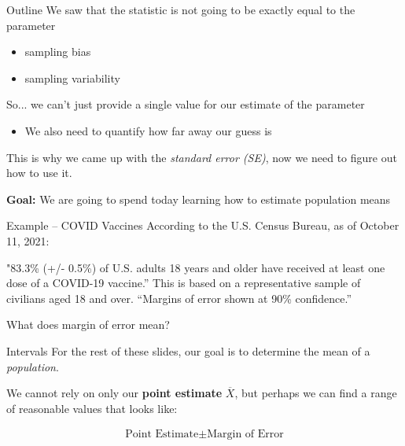 \documentclass{beamer}
\begin{document}
\begin{frame}{Outline}
We saw that the statistic is not going to be exactly equal to the parameter
\begin{itemize}
    \item sampling bias
    \item sampling variability
\end{itemize} \vspace{6mm}

So... we can't just provide a single value for our estimate of the parameter
\begin{itemize}
    \item We also need to quantify how far away our guess is
\end{itemize} \vspace{6mm}

This is why we came up with the \textit{standard error (SE)}, now we need to figure out how to use it. \vspace{6mm}

\textbf{Goal:} We are going to spend today learning how to estimate population means
\end{frame}

\begin{frame}{Example -- COVID Vaccines}
According to the U.S. Census Bureau, as of October 11, 2021: \vspace{2mm}

"83.3\% (+/- 0.5\%) of U.S. adults 18 years and older have received at least one dose of a COVID-19 vaccine.” This is based on a representative sample of civilians aged 18 and over. “Margins of error shown at 90\% confidence.”
\vspace{10mm}

What does margin of error mean?
\end{frame}

\begin{frame}{Intervals}
For the rest of these slides, our goal is to determine the mean of a \textit{population}. \vspace{12mm}

We cannot rely on only our \textbf{point estimate} $\overline{X}$, but perhaps we can find a range of reasonable values that looks like:


\begin{align*}
\text{Point Estimate} \pm \text{Margin of Error}
\end{align*}
\end{frame}
\end{document}
